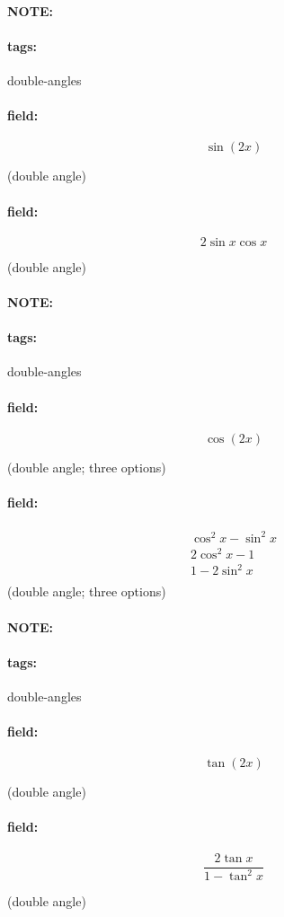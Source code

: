 \documentclass[12pt]{article}
\newenvironment{note}{\paragraph{NOTE:}}{}
\newenvironment{field}{\paragraph{field:}}{}
\newcommand*{\tags}[1]{\paragraph{tags: }#1}
\begin{document}
\begin{note}
    \tags{double-angles}
    \begin{field}
    \[  
        \sin(2x)
    \] 
    \begin{center}
    (double angle)
    \end{center}
    \end{field}
    \begin{field}
    \[
        2 \sin x \cos x
    \] 
    \begin{center}
    (double angle)
    \end{center}
    \end{field}
\end{note}



\begin{note}
    \tags{double-angles}
    \begin{field}
    \[  
        \cos(2x)
    \] 
    \begin{center}
    (double angle; three options)
    \end{center}
    \end{field}
    \begin{field}
        \begin{center}
        \begin{gather*}
        \cos^2 x - \sin^2 x \\ 
        2 \cos^2 x - 1 \\ 
        1 - 2 \sin^2 x\\
        \end{gather*}
       (double angle; three options)
        \end{center}
    \end{field}
\end{note}
 

 \begin{note}
    \tags{double-angles}
    \begin{field}
    \[  
        \tan(2x)  
    \] 
    \begin{center}
    (double angle)
    \end{center}
    \end{field}
    \begin{field}
    \[
        \frac{2 \tan x}{1 - \tan^2 x}
    \] 
    \begin{center}
    (double angle)
    \end{center}
    \end{field}
\end{note}
\end{document}
